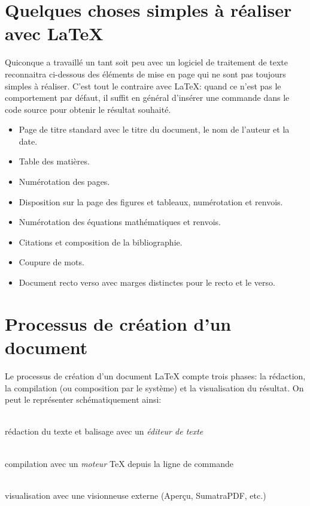 \section{Quelques choses simples à réaliser avec {\LaTeX}}

Quiconque a travaillé un tant soit peu avec un logiciel de traitement
de texte reconnaitra ci-dessous des éléments de mise en page qui ne
sont pas toujours simples à réaliser. C'est tout le contraire avec
{\LaTeX}: quand ce n'est pas le comportement par défaut, il suffit en
général d'insérer une commande dans le code source pour obtenir le
résultat souhaité.

\begin{itemize}
\item Page de titre standard avec le titre du document, le nom de
  l'auteur et la date.
\item Table des matières.
\item Numérotation des pages.
\item Disposition sur la page des figures et tableaux, numérotation et
  renvois.
\item Numérotation des équations mathématiques et renvois.
\item Citations et composition de la bibliographie.
\item Coupure de mots.
\item Document recto verso avec marges distinctes pour le recto et le
  verso.
\end{itemize}


\section{Processus de création d'un document}
\label{sec:presentation:processus}

Le processus de création d'un document {\LaTeX} compte trois phases:
la rédaction, la compilation (ou composition par le système) et la
visualisation du résultat. On peut le représenter schématiquement
ainsi:
\begin{center}
  \begin{minipage}[t]{0.25\linewidth}
    \centering
    {\Huge\faFileTextO} \\ \medskip
    rédaction du texte et balisage avec un \emph{éditeur de texte}
  \end{minipage}
  \quad{\Large\faArrowRight}\quad
  \begin{minipage}[t]{0.25\linewidth}
    \centering
    {\Huge\faCogs} \\ \medskip
    compilation avec un \emph{moteur} {\TeX} depuis la ligne de commande
  \end{minipage}
  \quad{\Large\faArrowRight}\quad
  \begin{minipage}[t]{0.25\linewidth}
    \centering
    {\Huge\faFilePdfO} \\ \medskip
    visualisation avec une visionneuse externe (Aperçu,
    SumatraPDF, etc.)
  \end{minipage}
\end{center}

